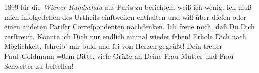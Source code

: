 \begin{ledgroupsized}[t]{13cm}
{{{                     1899 für die \emph{Wiener Rundschau}
                  aus Paris zu berichten.}}}\label{K_L02879-3h} weiß ich {\pb}wenig. Ich muß mich infolgedeſſen des Urtheils
               einſtweilen enthalten und will über dieſen oder einen anderen Pariſer Correſpondenten nachdenken.\pend
           \pstart
           Ich freue mich, daß Du Dich zerſtreuſt. Könnte ich Dich nur endlich einmal wieder
               ſehen!\pend
           \pstart
           Erhole Dich nach Möglichkeit, ſchreib’ mir bald und ſei von Herzen gegrüßt!\pend
           \pstart
           Dein treuer {\\[\baselineskip]}\spacefill\mbox{Paul Goldmann}\pend
           \leftskip=0em{}\pstart
           \noindent{}Bitte, viele Grüße an Deine Frau Mutter und Frau Schweſter zu beſtellen!\pend
           
         
         \endnumbering{}\end{ledgroupsized}  \newcommand{\dateiname}{L02879}\newcommand{\titel}{Paul Goldmann an Arthur Schnitzler, 17. 7. 1899}\newcommand{\editorInnen}{Martin Anton Müller und Laura Untner}
      